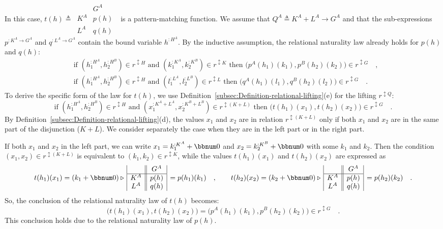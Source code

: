 In this case, $t(h)\triangleq\,\begin{array}{|c||c|}
 & G^{A}\\
\hline K^{A} & p(h)\\
L^{A} & q(h)
\end{array}\,\,$ is a pattern-matching function. We assume that $Q^{A}\triangleq K^{A}+L^{A}\rightarrow G^{A}$
and that the sub-expressions $p^{:K^{A}\rightarrow G^{A}}$ and $q^{:L^{A}\rightarrow G^{A}}$
contain the bound variable $h^{:H^{A}}$. By the inductive assumption,
the relational naturality law already holds for $p(h)$ and $q(h)$:
\begin{align*}
 & \text{if }(h_{1}^{:H^{A}},h_{2}^{:H^{B}})\in r^{\updownarrow H}\text{ and }(k_{1}^{:K^{A}},k_{2}^{:K^{B}})\in r^{\updownarrow K}\text{ then }\big(p^{A}(h_{1})(k_{1}),p^{B}(h_{2})(k_{2})\big)\in r^{\updownarrow G}\quad,\\
 & \text{if }(h_{1}^{:H^{A}},h_{2}^{:H^{B}})\in r^{\updownarrow H}\text{ and }(l_{1}^{:L^{A}},l_{2}^{:L^{B}})\in r^{\updownarrow L}\text{ then }\big(q^{A}(h_{1})(l_{1}),q^{B}(h_{2})(l_{2})\big)\in r^{\updownarrow G}\quad.
\end{align*}
To derive the specific form of the law for $t(h)$, we use Definition~\ref{subsec:Definition-relational-lifting}(e)
for the lifting $r^{\updownarrow Q}$:
\[
\text{if }(h_{1}^{:H^{A}},h_{2}^{:H^{B}})\in r^{\updownarrow H}\text{ and }(x_{1}^{:K^{A}+L^{A}},x_{2}^{:K^{B}+L^{B}})\in r^{\updownarrow(K+L)}\text{ then }\big(t(h_{1})(x_{1}),t(h_{2})(x_{2})\big)\in r^{\updownarrow G}\quad.
\]
By Definition~\ref{subsec:Definition-relational-lifting}(d), the
values $x_{1}$ and $x_{2}$ are in relation $r^{\updownarrow(K+L)}$
only if both $x_{1}$ and $x_{2}$ are in the same part of the disjunction
($K+L$). We consider separately the case when they are in the left
part or in the right part.

If both $x_{1}$ and $x_{2}$ in the left part, we can write $x_{1}=k_{1}^{:K^{A}}+\bbnum 0$
and $x_{2}=k_{2}^{:K^{B}}+\bbnum 0$ with some $k_{1}$ and $k_{2}$.
Then the condition $(x_{1},x_{2})\in r^{\updownarrow(K+L)}$ is equivalent
to $(k_{1},k_{2})\in r^{\updownarrow K}$, while the values $t(h_{1})(x_{1})$
and $t(h_{2})(x_{2})$ are expressed as
\[
t(h_{1})(x_{1})=(k_{1}+\bbnum 0)\triangleright\,\begin{array}{|c||c|}
 & G^{A}\\
\hline K^{A} & p(h)\\
L^{A} & q(h)
\end{array}\,=p(h_{1})(k_{1})\quad,\quad\quad t(h_{2})(x_{2})=(k_{2}+\bbnum 0)\triangleright\,\begin{array}{|c||c|}
 & G^{A}\\
\hline K^{A} & p(h)\\
L^{A} & q(h)
\end{array}\,=p(h_{2})(k_{2})\quad.
\]
So, the conclusion of the relational naturality law of $t(h)$ becomes:
\[
\big(t(h_{1})(x_{1}),t(h_{2})(x_{2})\big)=\big(p^{A}(h_{1})(k_{1}),p^{B}(h_{2})(k_{2})\big)\in r^{\updownarrow G}\quad.
\]
This conclusion holds due to the relational naturality law of $p(h)$.

